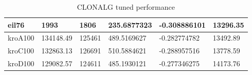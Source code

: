 \begin{table}[H]
\begin{tabular}{|l|l|l|l|p{2.5cm}|p{2cm}|}
		eil76     & 1993        & 1806      & 235.6877323 & -0.308886101                                                    & 13296.35 \\ \hline
		kroA100   & 134148.49   & 125461    & 489.5169627 & -0.282774782                                                    & 13492.89 \\ \hline
		kroC100   & 132863.13   & 126691    & 510.5884621 & -0.288957516                                                    & 13778.59 \\ \hline
		kroD100   & 129082.57   & 124611    & 485.1930121 & -0.277346275                                                    & 14173.76 \\ \hline
	\end{tabular}
	\caption{CLONALG tuned performance}
	\label{tab:clonalg_tuned}
\end{table}
